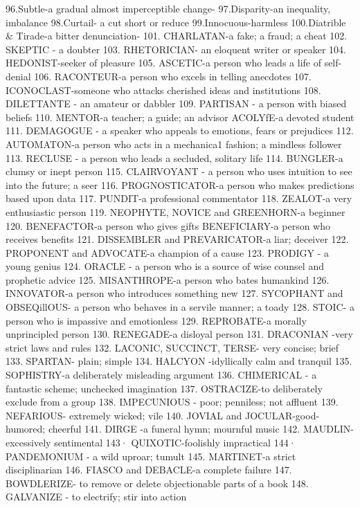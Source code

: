 \documentclass{exam}
\begin{document}
\begin{questions}
96.Subtle-a gradual almost imperceptible change-
97.Disparity-an inequality, imbalance
98.Curtail- a cut short or reduce
99.Innocuous-harmless
100.Diatrible \& Tirade-a bitter denunciation- 
101. CHARLATAN-a fake; a fraud; a cheat
102. SKEPTIC - a doubter
103. RHETORICIAN- an eloquent writer or speaker
104. HEDONIST-seeker of pleasure
105. ASCETIC-a person who leads a life of self-denial
106. RACONTEUR-a person who excels in telling anecdotes
107. ICONOCLAST-someone who attacks cherished ideas and institutions
108. DILETTANTE - an amateur or dabbler
109. PARTISAN - a person with biased beliefs
110. MENTOR-a teacher; a guide; an advisor ACOLYfE-a devoted student
111. DEMAGOGUE - a speaker who appeals to emotions, fears or prejudices
112. AUTOMATON-a person who acts in a mechanica1 fashion; a mindless follower
113. RECLUSE - a person who leads a secluded, solitary life
114. BUNGLER-a clumsy or inept person
115. CLAIRVOYANT - a person who uses intuition to see into the future; a seer
116. PROGNOSTICATOR-a person who makes predictions based upon data
117. PUNDIT-a professional commentator
118. ZEALOT-a very enthusiastic person
119. NEOPHYTE, NOVICE and GREENHORN-a beginner
120. BENEFACTOR-a person who gives gifts BENEFICIARY-a person who receives benefits
121. DISSEMBLER and PREVARICATOR-a liar; deceiver
122. PROPONENT and ADVOCATE-a champion of a cause
123. PRODIGY - a young genius
124. ORACLE - a person who is a source of wise counsel and prophetic advice
125. MISANTHROPE-a person who bates humankind
126. INNOVATOR-a person who introduces something new
127. SYCOPHANT and OBSEQillOUS- a person who behaves in a servile manner; a toady
128. STOIC- a person who is impassive and emotionless
129. REPROBATE-a morally unprincipled person
130. RENEGADE-a disloyal person
131. DRACONIAN -very strict laws and rules
132. LACONIC, SUCCINCT, TERSE- very concise; brief
133. SPARTAN- plain; simple
134. HALCYON -idyllically calm and tranquil
135. SOPHISTRY-a deliberately misleading argument
136. CHIMERICAL - a fantastic scheme; unchecked imagination
137. OSTRACIZE-to deliberately exclude from a group
138. IMPECUNIOUS - poor; penniless; not affluent
139. NEFARIOUS- extremely wicked; vile
140. JOVIAL and JOCULAR-good-humored; cheerful
141. DIRGE -a funeral hymn; mournful music
142. MAUDLIN-excessively sentimental
143· QUIXOTIC-foolishly impractical
144· PANDEMONIUM - a wild uproar; tumult
145. MARTINET-a strict disciplinarian
146. FIASCO and DEBACLE-a complete failure
147. BOWDLERIZE- to remove or delete objectionable parts of a book
148. GALVANIZE - to electrify; stir into action

\end{questions}
\end{document}
